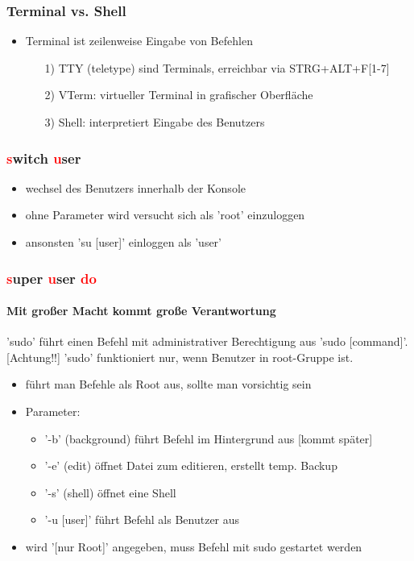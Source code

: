 \documentclass[12pt,utf8]{beamer}
\begin{document}
\begin{frame}
\frametitle{Terminal vs. Shell}
\begin{itemize}
	\item Terminal ist zeilenweise Eingabe von Befehlen
	\begin{itemize}
		\item[1)] TTY (teletype) sind Terminals, erreichbar via STRG+ALT+F[1-7]
		\item[2)] VTerm: virtueller Terminal in grafischer Oberfläche
		\item[3)] Shell: interpretiert Eingabe des Benutzers
	\end{itemize}
\end{itemize}
\end{frame}

\begin{frame}
\frametitle{\textcolor{red}{s}witch \textcolor{red}{u}ser}
\begin{itemize}
	\item wechsel des Benutzers innerhalb der Konsole
	\item ohne Parameter wird versucht sich als 'root' einzuloggen
	\item ansonsten 'su [user]' einloggen als 'user'
\end{itemize}
\end{frame}

\begin{frame}
\frametitle{\textcolor{red}{s}uper \textcolor{red}{u}ser \textcolor{red}{do}}
\framesubtitle{Mit großer Macht kommt große Verantwortung}
'sudo' führt einen Befehl mit administrativer Berechtigung aus 'sudo [command]'.
[Achtung!!] 'sudo' funktioniert nur, wenn Benutzer in root-Gruppe ist.
\begin{itemize}[<+->]
	\item führt man Befehle als Root aus, sollte man vorsichtig sein
	\item Parameter:
	\begin{itemize}[<+->]
		\item '-b' (background) führt Befehl im Hintergrund aus [kommt später]
		\item '-e' (edit) öffnet Datei zum editieren, erstellt temp. Backup
		\item '-s' (shell) öffnet eine Shell
		\item '-u [user]' führt Befehl als Benutzer aus
	\end{itemize}
	\item wird '[nur Root]' angegeben, muss Befehl mit sudo gestartet werden
\end{itemize}
\end{frame}
\end{document}
